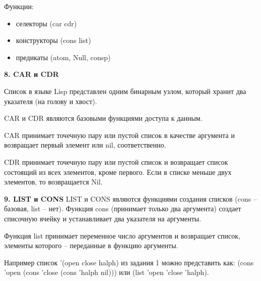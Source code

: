 Функции:
\begin{itemize}
	\item селекторы (car cdr)
	\item конструкторы (cons list)
	\item предикаты (atom, Null, consp)
\end{itemize}
\textbf{8. CAR и CDR}

Список в языке Lisp представлен одним бинарным узлом, который хранит два указателя (на голову и хвост). 

CAR и CDR являются базовыми функциями доступа к данным. 

CAR принимает точечную пару или пустой список в качестве аргумента и возвращает первый элемент или nil, соответственно. 

CDR принимает точечную пару или пустой список и возвращает список состоящий из всех элементов, кроме первого. Если в списке меньше двух элементов, то возвращается Nil.


\textbf{9. LIST и CONS}
LIST и CONS являются функциями создания списков (cons – базовая, list – нет).
Функция cons (принимает только два аргумента) создает списочную ячейку и устанавливает два указателя на аргументы. 

Функция list принимает переменное число аргументов и возвращает список, элементы которого – переданные в функцию аргументы.



Например список '(open close halph) из задания 1 можно представить как:
(cons 'open (cons 'close (cons 'halph nil))) 
или (list 'open 'close 'halph).